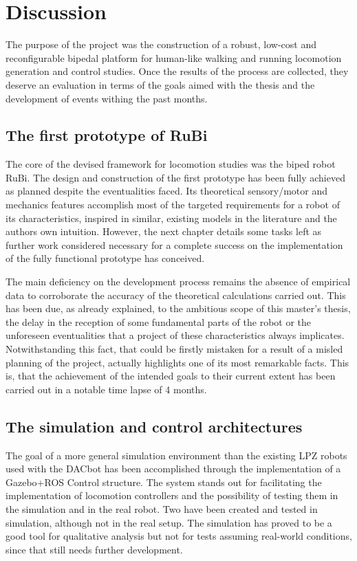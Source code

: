 \chapter{Discussion} %
\label{cha:discussion}
The purpose of the project was the construction of a robust, low-cost
and reconfigurable bipedal platform for human-like walking and running locomotion
generation and control studies.
Once the results of the process are collected, they deserve an evaluation in terms of the goals aimed with the thesis and the development of events withing the past months.

\section{The first prototype of RuBi} %
\label{sec:the_prototype_of_rubi}
The core of the devised framework for locomotion studies was the biped robot RuBi.
The design and construction of the first prototype has been fully achieved as planned despite the eventualities faced.
Its theoretical sensory/motor and mechanics features accomplish most of the targeted requirements for a robot of its characteristics, inspired in similar, existing models in the literature and the authors own intuition.
However, the next chapter details some tasks left as further work considered necessary for a complete success on the implementation of the fully functional prototype has conceived.

The main deficiency on the development process remains the absence of empirical data to corroborate the accuracy of the theoretical calculations carried out.
This has been due, as already explained, to the ambitious scope of this master's thesis, the delay in the reception of some fundamental parts of the robot or the unforeseen eventualities that a project of these characteristics always implicates.
Notwithstanding this fact, that could be firstly mistaken for a result of a misled planning of the project, actually highlights one of its most remarkable facts.
This is, that the achievement of the intended goals to their current extent has been carried out in a notable time lapse of 4 months.

\section{The simulation and control architectures} %
\label{sec:the_simulation_and_control_architectures}
The goal of a more general simulation environment than the existing LPZ robots used with the DACbot has been accomplished through the implementation of a Gazebo+ROS Control structure.
The system stands out for facilitating the implementation of locomotion controllers and the possibility of testing them in the simulation and in the real robot.
Two have been created and tested in simulation, although not in the real setup.
The simulation has proved to be a good tool for qualitative analysis but not for tests assuming real-world conditions, since that still needs further development.

